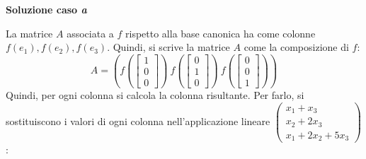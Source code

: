\documentclass[a4paper]{article}
\begin{document}
	\noindent
	\textcolor{Green4}{\textbf{Soluzione caso \emph{a}}}\newline
	
	\noindent
	La matrice $A$ associata a $f$ rispetto alla base canonica ha come colonne $f\left(e_{1}\right), f\left(e_{2}\right), f\left(e_{3}\right)$. Quindi, si scrive la matrice $A$ come la composizione di $f$:
	\begin{equation*}
		A = \left( f\left(\begin{bmatrix}
			1 \\
			0 \\
			0
		\end{bmatrix}\right) \: f\left(\begin{bmatrix}
			0 \\
			1 \\
			0
		\end{bmatrix}\right) \: f\left(\begin{bmatrix}
			0 \\
			0 \\
			1
		\end{bmatrix}\right)\right)
	\end{equation*}
	Quindi, per ogni colonna si calcola la colonna risultante. Per farlo, si sostituiscono i valori di ogni colonna nell'applicazione lineare $\begin{pmatrix}
		x_{1} + x_{3} 	\\
		x_{2} + 2x_{3} 	\\
		x_{1} + 2x_{2} + 5x_{3}
	\end{pmatrix}$:
\end{document}
